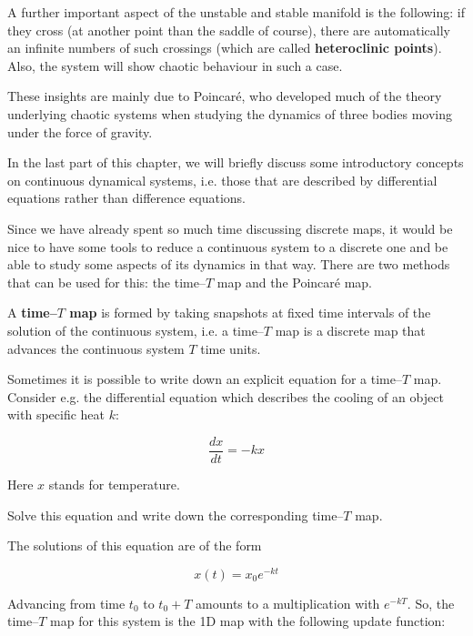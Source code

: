 A further important aspect of the unstable and stable manifold is the following: if they cross (at another point than the saddle of course), there are automatically an infinite numbers of such crossings (which are called \textbf{heteroclinic points}). Also, the system will show chaotic behaviour in such a case.

These insights are mainly due to Poincar\'{e}, who developed much of the theory underlying chaotic systems when studying the dynamics of three bodies moving under the force of gravity.

\pagebreak


In the last part of this chapter, we will briefly discuss some introductory concepts on continuous dynamical systems, i.e. those that are described by differential equations rather than difference equations.

Since we have already spent so much time discussing discrete maps, it would be nice to have some tools to reduce a continuous system to a discrete one and be able to study some aspects of its dynamics in that way. There are two methods that can be used for this: the time--$T$ map and the Poincar\'{e} map.

A \textbf{time--$T$ map} is formed by taking snapshots at fixed time intervals of the solution of the continuous system, i.e. a time--$T$ map is a discrete map that advances the continuous system $T$ time units. 

Sometimes it is possible to write down an explicit equation for a time--$T$ map. Consider e.g. the differential equation which describes the cooling of an object with specific heat $k$:

\begin{equation}
\frac{dx}{dt} = -k x
\end{equation} 

Here $x$ stands for temperature.

\begin{cue}
Solve this equation and write down the corresponding time--$T$ map.  
\end{cue}

The solutions of this equation are of the form

\begin{equation}
x(t) = x_0 e^{-kt}
\end{equation} 

Advancing from time $t_0$ to $t_0+T$ amounts to a multiplication with $e^{-kT}$. So, the time--$T$ map for this system is the 1D map with the following update function:

